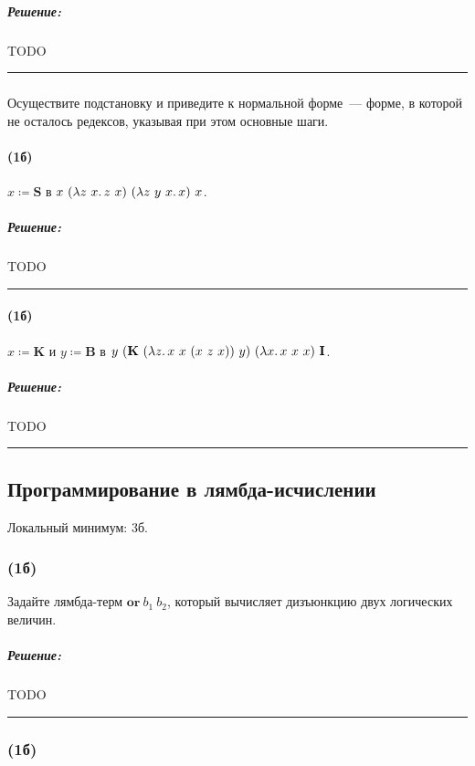 \documentclass{article}
\newenvironment{proof}{\subparagraph{\hspace{-1em}Решение:\newline}}{\par\noindent\rule{\textwidth}{0.4pt}}
\newcommand{\comb}[1]{\mathbf{#1}}
\newcommand{\termdef}{\coloneqq}
\begin{document}
    \begin{proof}
        TODO %
    \end{proof}

    \subsubsection{}

    Осуществите подстановку и приведите к нормальной форме~--- форме, в которой не осталось редексов, указывая при этом основные шаги.

    \paragraph{(1б)}

    $x \termdef \comb{S}$ в $x~(\lambda z~x\ldotp z~x)~(\lambda z~y~x\ldotp x)~x$.

    \begin{proof}
        TODO %
    \end{proof}

    \paragraph{(1б)}

    $x \termdef \comb{K}$ и $y \termdef \comb{B}$ в $y~(\comb{K}~(\lambda z\ldotp x~x~(x~z~x))~y)~(\lambda x\ldotp x~x~x)~\comb{I}$.

    \begin{proof}
        TODO %
    \end{proof}

    \subsection{Программирование в лямбда-исчислении}

    Локальный минимум: 3б.

    \subsubsection{(1б)}

    Задайте лямбда-терм $\textbf{or}~b_1~b_2$, который вычисляет дизъюнкцию двух логических величин.

    \begin{proof}
        TODO %
    \end{proof}

    \subsubsection{(1б)}
\end{document}
